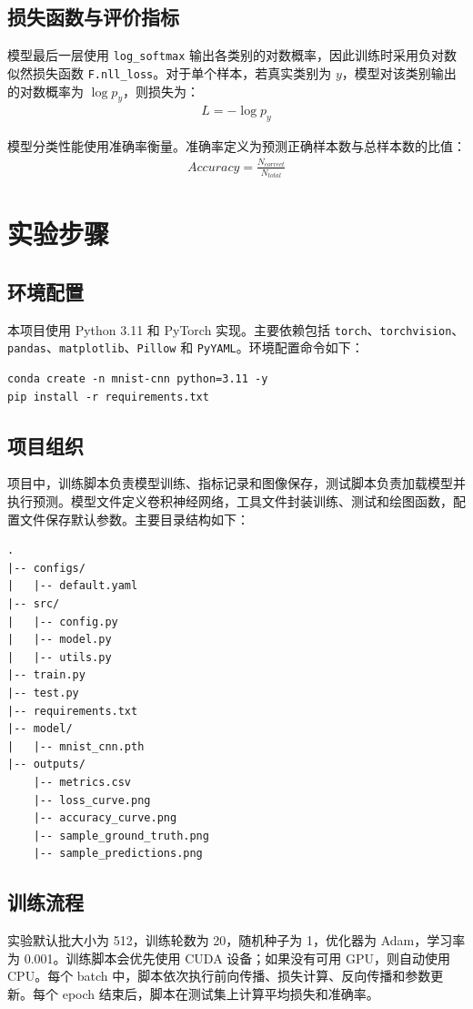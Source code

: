 \documentclass[UTF8,a4paper,10pt]{ctexart}
\begin{document}
\subsection{损失函数与评价指标}
模型最后一层使用 \texttt{log\_softmax} 输出各类别的对数概率，因此训练时采用负对数似然损失函数 \texttt{F.nll\_loss}。对于单个样本，若真实类别为 $y$，模型对该类别输出的对数概率为 $\log p_y$，则损失为：
\begin{align}
  L = -\log p_y
\end{align}

模型分类性能使用准确率衡量。准确率定义为预测正确样本数与总样本数的比值：
\begin{align}
  Accuracy = \frac{N_{correct}}{N_{total}}
\end{align}

\section{实验步骤}
\subsection{环境配置}
本项目使用 Python 3.11 和 PyTorch 实现。主要依赖包括 \texttt{torch}、\texttt{torchvision}、\texttt{pandas}、\texttt{matplotlib}、\texttt{Pillow} 和 \texttt{PyYAML}。环境配置命令如下：
\begin{lstlisting}[title=环境配置命令,frame=trbl,language={}]
conda create -n mnist-cnn python=3.11 -y
pip install -r requirements.txt
\end{lstlisting}

\subsection{项目组织}
项目中，训练脚本负责模型训练、指标记录和图像保存，测试脚本负责加载模型并执行预测。模型文件定义卷积神经网络，工具文件封装训练、测试和绘图函数，配置文件保存默认参数。主要目录结构如下：
\begin{lstlisting}[title=项目目录结构,frame=trbl,language={}]
.
|-- configs/
|   |-- default.yaml
|-- src/
|   |-- config.py
|   |-- model.py
|   |-- utils.py
|-- train.py
|-- test.py
|-- requirements.txt
|-- model/
|   |-- mnist_cnn.pth
|-- outputs/
    |-- metrics.csv
    |-- loss_curve.png
    |-- accuracy_curve.png
    |-- sample_ground_truth.png
    |-- sample_predictions.png
\end{lstlisting}

\subsection{训练流程}
实验默认批大小为 512，训练轮数为 20，随机种子为 1，优化器为 Adam，学习率为 0.001。训练脚本会优先使用 CUDA 设备；如果没有可用 GPU，则自动使用 CPU。每个 batch 中，脚本依次执行前向传播、损失计算、反向传播和参数更新。每个 epoch 结束后，脚本在测试集上计算平均损失和准确率。
\end{document}
